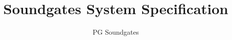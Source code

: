 \documentclass[]{scrreprt}
\title{Soundgates System Specification}
\author{PG Soundgates}
\begin{document}
\maketitle

\begin{abstract}
\end{abstract}
\end{document}

